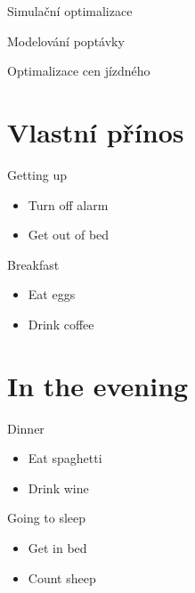 \documentclass[ignorenonframetext,]{beamer}
\providecommand{\tightlist}{%
\setlength{\itemsep}{0pt}\setlength{\parskip}{0pt}}
\begin{document}
\begin{frame}{Simulační optimalizace}

\end{frame}

\begin{frame}{Modelování poptávky}

\end{frame}

\begin{frame}{Optimalizace cen jízdného}

\end{frame}

\section{Vlastní přínos}\label{vlastni-prinos}

\begin{frame}{Getting up}

\begin{itemize}
\tightlist
\item
  Turn off alarm
\item
  Get out of bed
\end{itemize}

\end{frame}

\begin{frame}{Breakfast}

\begin{itemize}
\tightlist
\item
  Eat eggs
\item
  Drink coffee
\end{itemize}

\end{frame}

\section{In the evening}\label{in-the-evening}

\begin{frame}{Dinner}

\begin{itemize}
\tightlist
\item
  Eat spaghetti
\item
  Drink wine
\end{itemize}

\end{frame}

\begin{frame}{Going to sleep}

\begin{itemize}
\tightlist
\item
  Get in bed
\item
  Count sheep
\end{itemize}

\end{frame}
\end{document}
